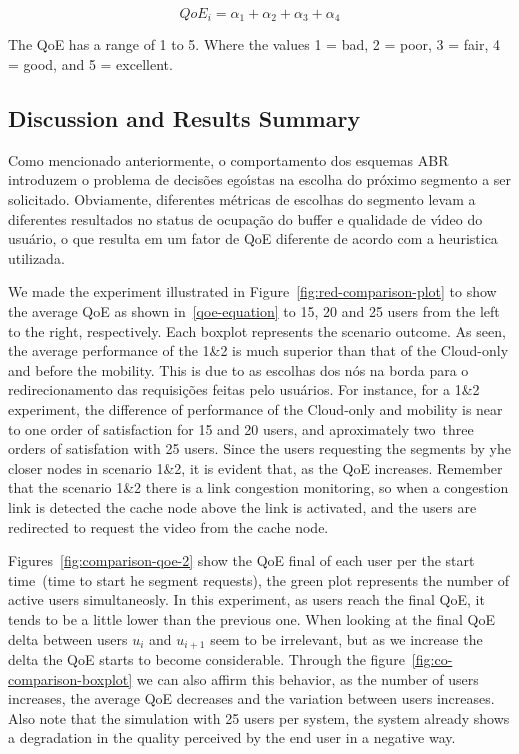 \begin{equation}\label{qoe-equation}
QoE_i = \alpha_1 + \alpha_2 + \alpha_3 + \alpha_4
\end{equation}

The QoE has a range of 1 to 5. Where the values 1 = bad, 2 = poor, 3 = fair, 4 = good, and 5 = excellent.



\subsection{Discussion and Results Summary}

Como mencionado anteriormente, o comportamento dos esquemas ABR introduzem o problema de
decisões egoı́stas na escolha do próximo segmento a ser solicitado. Obviamente, diferentes métricas
de escolhas do segmento levam a diferentes resultados no status de ocupação do buffer e qualidade de
vı́deo do usuário, o que resulta em um fator de QoE diferente de acordo com a heuristica utilizada.

We made the experiment illustrated in Figure~\ref{fig:red-comparison-plot} to show the average QoE as shown in~\ref{qoe-equation} to 15, 20 and 25 users from the left to the right, respectively. Each boxplot represents the scenario outcome. As seen, the average performance of the 1\&2 is much superior than that of the Cloud-only and before the mobility. This is due to as escolhas dos nós na borda para o redirecionamento das requisições feitas pelo usuários. For instance, for a 1\&2 experiment, the difference of performance of the Cloud-only and mobility is near to one order of satisfaction for 15 and 20 users, and aproximately two~three orders of satisfation with 25 users. 
%
Since the users requesting the segments by yhe closer nodes in scenario 1\&2, it is
evident that, as the QoE increases. Remember that the scenario 1\&2 there is a link congestion monitoring, so when a congestion link is detected the cache node above the link is activated, and the users are redirected to request the video from the cache node. 

Figures~\ref{fig:comparison-qoe-2} show the QoE final of each user per the start time~(time to start he segment requests), the green plot represents the number of active users simultaneosly.  
In this experiment, as users reach the final QoE, it tends to be a little lower than the previous one. When looking at the final QoE delta between users $u_{i}$ and $u_{i + 1}$ seem to be irrelevant, but as we increase the delta the QoE starts to become considerable. Through the figure~\ref{fig:co-comparison-boxplot} we can also affirm this behavior, as the number of users increases, the average QoE decreases and the variation between users increases. Also note that the simulation with 25 users per system, the system already shows a degradation in the quality perceived by the end user in a negative way.

